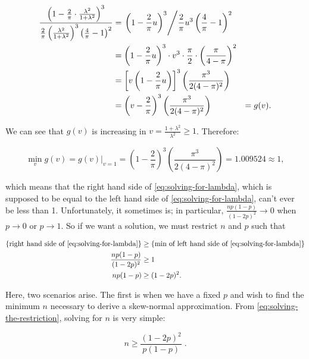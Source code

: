 \documentclass{article}
\begin{document}
\begin{alignat}{3}
  \frac{\left( 1 - \frac{2}{\pi} \cdot \frac{\lambda^2}{1+\lambda^2} \right)^3}{\frac{2}{\pi} \left( \frac{\lambda^2}{1+\lambda^2} \right)^3 \left( \frac{4}{\pi} - 1 \right)^2}
    &= \left. \left( 1 - \frac{2}{\pi} u \right)^3 \middle/ \frac{2}{\pi} u^3 \left( \frac{4}{\pi} - 1 \right)^2 \right. & \nonumber \\
  &= \left( 1 - \frac{2}{\pi} u \right)^3 \cdot v^3 \cdot \frac{\pi}{2} \cdot \left( \frac{\pi}{4-\pi} \right)^2 & \nonumber \\
  &= \left[ v \left( 1 - \frac{2}{\pi} u \right) \right]^3 \left( \frac{\pi^3}{2(4-\pi)^2} \right) & \nonumber \\
  &= \left( v - \frac{2}{\pi} \right)^3 \left( \frac{\pi^3}{2(4-\pi)^2} \right) &= g(v). \label{eq:lhs-solving-for-lambda}
\end{alignat}

We can see that $g(v)$ is increasing in $v = \frac{1+\lambda^2}{\lambda^2} \geq
1$. Therefore:

\begin{equation}
  \min_{v} g(v) = g(v)|_{v=1} = \left( 1 - \frac{2}{\pi} \right)^3 \left( \frac{\pi^3}{2(4-\pi)^2} \right) = 1.009524 \approx 1,
\end{equation}

which means that the right hand side of \eqref{eq:solving-for-lambda}, which is
supposed to be equal to the left hand side of \eqref{eq:solving-for-lambda},
can't ever be less than 1. Unfortunately, it sometimes is; in particular,
$\frac{np(1-p)}{(1-2p)^2} \to 0$ when $p \to 0$ or $p \to 1$. So if we want a
solution, we must restrict $n$ and $p$ such that

\begin{align}
  \textnormal{\{right hand side of \eqref{eq:solving-for-lambda}\}} &\geq \textnormal{\{min of left hand side of \eqref{eq:solving-for-lambda}\}} \nonumber \\
  \frac{np(1-p)}{(1-2p)^2} &\geq 1 \nonumber \\
  np(1-p) &\geq (1-2p)^2. \label{eq:solving-the-restriction}
\end{align}

Here, two scenarios arise. The first is when we have a fixed $p$ and wish to
find the minimum $n$ necessary to derive a skew-normal approximation. From
\eqref{eq:solving-the-restriction}, solving for $n$ is very simple:

\begin{equation}
  n \geq \frac{(1-2p)^2}{p(1-p)} \;. \label{eq: n for a given p}
\end{equation}
\end{document}
